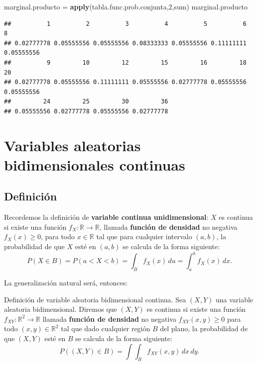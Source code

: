 \documentclass[]{book}
\newenvironment{Shaded}{\begin{snugshade}}{\end{snugshade}}
\newcommand{\DecValTok}[1]{\textcolor[rgb]{0.00,0.00,0.81}{#1}}
\newcommand{\KeywordTok}[1]{\textcolor[rgb]{0.13,0.29,0.53}{\textbf{#1}}}
\newcommand{\NormalTok}[1]{#1}
\newcommand{\StringTok}[1]{\textcolor[rgb]{0.31,0.60,0.02}{#1}}
\begin{document}
\begin{Shaded}
\begin{Highlighting}[]
\NormalTok{marginal.producto =}\StringTok{ }\KeywordTok{apply}\NormalTok{(tabla.func.prob.conjunta,}\DecValTok{2}\NormalTok{,sum)}
\NormalTok{marginal.producto}
\end{Highlighting}
\end{Shaded}

\begin{verbatim}
##          1          2          3          4          5          6          8 
## 0.02777778 0.05555556 0.05555556 0.08333333 0.05555556 0.11111111 0.05555556 
##          9         10         12         15         16         18         20 
## 0.02777778 0.05555556 0.11111111 0.05555556 0.02777778 0.05555556 0.05555556 
##         24         25         30         36 
## 0.05555556 0.02777778 0.05555556 0.02777778
\end{verbatim}

\hypertarget{variables-aleatorias-bidimensionales-continuas}{%
\section{Variables aleatorias bidimensionales continuas}\label{variables-aleatorias-bidimensionales-continuas}}

\hypertarget{definiciuxf3n-4}{%
\subsection{Definición}\label{definiciuxf3n-4}}

Recordemos la definición de \textbf{variable continua unidimensional}: \(X\) es continua si existe una función \(f_X:\mathbb{R}\longrightarrow \mathbb{R}\), llamada \textbf{función de densidad} no negativa \(f_X(x)\geq 0\), para todo \(x\in\mathbb{R}\) tal que para cualquier intervalo \((a,b)\), la probabilidad de que \(X\) esté en \((a,b)\) se calcula de la forma siguiente:
\[
P(X\in B)=P(a< X < b)=\int_B f_{X}(x)\,du=\int_a^b f_{X}(x)\,dx.
\]

La generalización natural será, entonces:

Definición de variable aleatoria bidimensional continua.
Sea \((X,Y)\) una variable aleatoria bidimensional. Diremos que \((X,Y)\) es continua si existe una función
\(f_{XY}:\mathbb{R}^2\longrightarrow \mathbb{R}\) llamada \textbf{función de densidad} no negativa \(f_{XY}(x,y)\geq 0\) para todo \((x,y)\in\mathbb{R}^2\) tal que dado cualquier región \(B\) del plano, la probabilidad de que \((X,Y)\) esté en \(B\) se calcula de la forma siguiente:
\[
P((X,Y)\in B)=\int\int_B f_{XY}(x,y)\,dx\,dy.
\]
\end{document}
